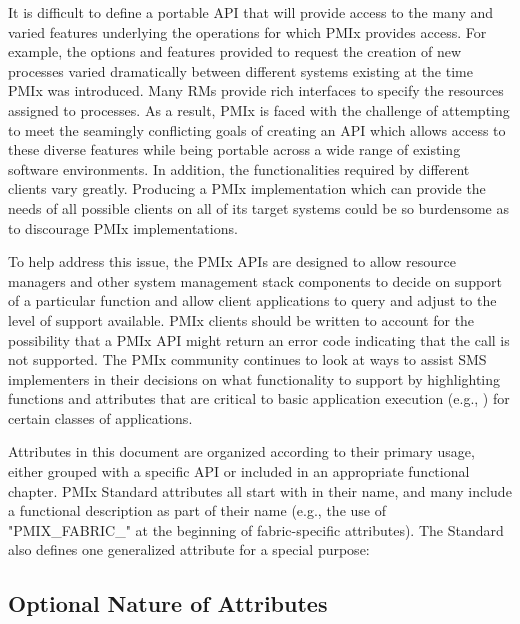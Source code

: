 It is difficult to define a portable \ac{API} that will provide access to the many
and varied features underlying the operations for which \ac{PMIx} provides access.
For example, the options and features provided to request the creation
of new processes varied dramatically between different systems existing
at the time \ac{PMIx} was introduced.  Many \acp{RM} provide rich interfaces
to specify the resources assigned to processes.
As a result, \ac{PMIx} is faced with the challenge
of attempting to meet the seamingly conflicting goals of creating an \ac{API} which allows
access to these diverse features while being portable across a wide range of
existing software environments. In addition, the functionalities required by different
clients vary greatly.  Producing a \ac{PMIx} implementation
which can provide the needs of all possible clients on all of its target systems
could be so burdensome as to discourage \ac{PMIx} implementations.

To help address this issue, the \ac{PMIx} \acp{API} are designed to allow resource managers
and other system management stack components to decide on support of a
particular function and allow client applications to query and adjust to the level of support available.  \ac{PMIx} clients should be written to account for the possibility that a \ac{PMIx} \ac{API} might return an error code indicating that the call is not supported.
The \ac{PMIx} community continues to look at ways to assist \ac{SMS} implementers in their decisions
on what functionality to support by highlighting functions and attributes that are
critical to basic application execution (e.g., ) for certain classes of applications.

Attributes in this document are organized according to their primary usage, either grouped with a specific \ac{API} or included in an appropriate functional chapter. \ac{PMIx} Standard attributes all start with  in their name, and many include a functional description as part of their name (e.g., the use of "PMIX_FABRIC_" at the beginning of fabric-specific attributes). The Standard also defines one generalized attribute for a special purpose:


\subsection{Optional Nature of Attributes}

